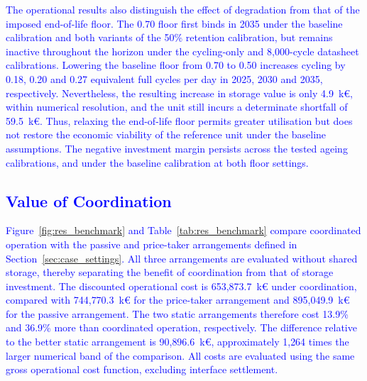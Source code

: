\documentclass[preprint,12pt]{elsarticle}
\begin{document}
\textcolor{blue}{
    The operational results also distinguish the effect of degradation from that of the imposed end-of-life floor. The 0.70 floor first binds in 2035 under the baseline calibration and both variants of the 50\% retention calibration, but remains inactive throughout the horizon under the cycling-only and 8{,}000-cycle datasheet calibrations. Lowering the baseline floor from 0.70 to 0.50 increases cycling by 0.18, 0.20 and 0.27 equivalent full cycles per day in 2025, 2030 and 2035, respectively. Nevertheless, the resulting increase in storage value is only 4.9~k\euro{}, within numerical resolution, and the unit still incurs a determinate shortfall of 59.5~k\euro{}. Thus, relaxing the end-of-life floor permits greater utilisation but does not restore the economic viability of the reference unit under the baseline assumptions. The negative investment margin persists across the tested ageing calibrations, and under the baseline calibration at both floor settings.
}

\subsection{\textcolor{blue}{Value of Coordination}}
\label{subsec:res_coordination}

\textcolor{blue}{
    Figure~\ref{fig:res_benchmark} and Table~\ref{tab:res_benchmark} compare coordinated operation with the passive and price-taker arrangements defined in Section~\ref{sec:case_settings}. All three arrangements are evaluated without shared storage, thereby separating the benefit of coordination from that of storage investment. The discounted operational cost is 653{,}873.7~k\euro{} under coordination, compared with 744{,}770.3~k\euro{} for the price-taker arrangement and 895{,}049.9~k\euro{} for the passive arrangement. The two static arrangements therefore cost 13.9\% and 36.9\% more than coordinated operation, respectively. The difference relative to the better static arrangement is 90{,}896.6~k\euro{}, approximately 1{,}264 times the larger numerical band of the comparison. All costs are evaluated using the same gross operational cost function, excluding interface settlement.
}
\end{document}
